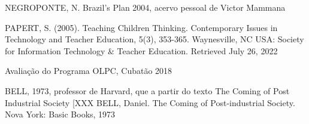 \documentclass[
12pt,		%
openright,	%
twoside,  %
a4paper,			%
chapter=TITLE,		%
english,			%
french,				%
spanish,			%
brazil				%
]{USPSC-classe/USPSC}
\begin{document}
\begin{flushleft}
\begin{flushleft}
\begin{flushleft}
\begin{flushleft}
[NEGROPONTE, 2004] NEGROPONTE, N. Brazil's Plan 2004, acervo pessoal de Victor Mammana
\end{flushleft}


\end{flushleft}


\end{flushleft}


\end{flushleft}


\begin{flushleft}
\begin{flushleft}
\begin{flushleft}
\begin{flushleft}
[PAPERT, 2005] PAPERT, S. (2005). Teaching Children Thinking. Contemporary Issues in Technology and Teacher Education, 5(3), 353-365. Waynesville, NC USA: Society for Information Technology \& Teacher Education. Retrieved July 26, 2022
\end{flushleft}


\end{flushleft}


\end{flushleft}


\end{flushleft}


\begin{flushleft}
\begin{flushleft}
\begin{flushleft}
\begin{flushleft}
 Avalia\c{c}\~ao do Programa OLPC, Cubat\~ao 2018
\end{flushleft}


\end{flushleft}


\end{flushleft}


\end{flushleft}


\begin{flushleft}
\begin{flushleft}
\begin{flushleft}
\begin{flushleft}
[BELL, 1973]  BELL, 1973, professor de Harvard, que a partir do texto The Coming of Post Industrial Society [XXX BELL, Daniel. The Coming of Post-industrial Society. Nova York: Basic Books, 1973
\end{flushleft}


\end{flushleft}


\end{flushleft}


\end{flushleft}
\end{document}

